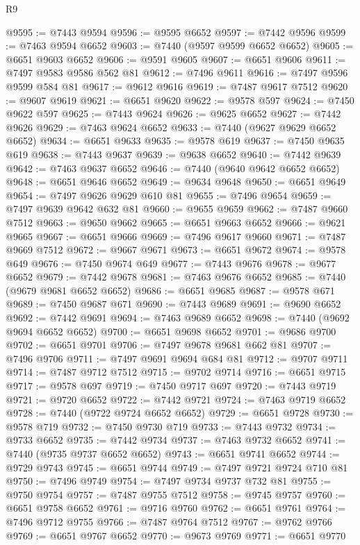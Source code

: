 \begin{lexlean}{R9}
\begin{coremodule}
{{{{{{{{{{{{{{{{{{{{{{{{{{{{{{{{{{{{{{{{{{{{{{{{{{{{{{{{{{{{{{{{{{{{{{{{{{{{{{{{{{{{@9595 := @7443 @9594
@9596 := @9595 @6652
@9597 := @7442 @9596
@9599 := @7463 @9594 @6652
@9603 := @7440 (@9597 @9599 @6652 @6652)
@9605 := @6651 @9603 @6652
@9606 := @9591 @9605
@9607 := @6651 @9606
@9611 := @7497 @9583 @9586 @562 @81
@9612 := @7496 @9611
@9616 := @7497 @9596 @9599 @584 @81
@9617 := @9612 @9616
@9619 := @7487 @9617 @7512
@9620 := @9607 @9619
@9621 := @6651 @9620
@9622 := @9578 @597
@9624 := @7450 @9622 @597
@9625 := @7443 @9624
@9626 := @9625 @6652
@9627 := @7442 @9626
@9629 := @7463 @9624 @6652
@9633 := @7440 (@9627 @9629 @6652 @6652)
@9634 := @6651 @9633
@9635 := @9578 @619
@9637 := @7450 @9635 @619
@9638 := @7443 @9637
@9639 := @9638 @6652
@9640 := @7442 @9639
@9642 := @7463 @9637 @6652
@9646 := @7440 (@9640 @9642 @6652 @6652)
@9648 := @6651 @9646 @6652
@9649 := @9634 @9648
@9650 := @6651 @9649
@9654 := @7497 @9626 @9629 @610 @81
@9655 := @7496 @9654
@9659 := @7497 @9639 @9642 @632 @81
@9660 := @9655 @9659
@9662 := @7487 @9660 @7512
@9663 := @9650 @9662
@9665 := @6651 @9663 @6652
@9666 := @9621 @9665
@9667 := @6651 @9666
@9669 := @7496 @9617 @9660
@9671 := @7487 @9669 @7512
@9672 := @9667 @9671
@9673 := @6651 @9672
@9674 := @9578 @649
@9676 := @7450 @9674 @649
@9677 := @7443 @9676
@9678 := @9677 @6652
@9679 := @7442 @9678
@9681 := @7463 @9676 @6652
@9685 := @7440 (@9679 @9681 @6652 @6652)
@9686 := @6651 @9685
@9687 := @9578 @671
@9689 := @7450 @9687 @671
@9690 := @7443 @9689
@9691 := @9690 @6652
@9692 := @7442 @9691
@9694 := @7463 @9689 @6652
@9698 := @7440 (@9692 @9694 @6652 @6652)
@9700 := @6651 @9698 @6652
@9701 := @9686 @9700
@9702 := @6651 @9701
@9706 := @7497 @9678 @9681 @662 @81
@9707 := @7496 @9706
@9711 := @7497 @9691 @9694 @684 @81
@9712 := @9707 @9711
@9714 := @7487 @9712 @7512
@9715 := @9702 @9714
@9716 := @6651 @9715
@9717 := @9578 @697
@9719 := @7450 @9717 @697
@9720 := @7443 @9719
@9721 := @9720 @6652
@9722 := @7442 @9721
@9724 := @7463 @9719 @6652
@9728 := @7440 (@9722 @9724 @6652 @6652)
@9729 := @6651 @9728
@9730 := @9578 @719
@9732 := @7450 @9730 @719
@9733 := @7443 @9732
@9734 := @9733 @6652
@9735 := @7442 @9734
@9737 := @7463 @9732 @6652
@9741 := @7440 (@9735 @9737 @6652 @6652)
@9743 := @6651 @9741 @6652
@9744 := @9729 @9743
@9745 := @6651 @9744
@9749 := @7497 @9721 @9724 @710 @81
@9750 := @7496 @9749
@9754 := @7497 @9734 @9737 @732 @81
@9755 := @9750 @9754
@9757 := @7487 @9755 @7512
@9758 := @9745 @9757
@9760 := @6651 @9758 @6652
@9761 := @9716 @9760
@9762 := @6651 @9761
@9764 := @7496 @9712 @9755
@9766 := @7487 @9764 @7512
@9767 := @9762 @9766
@9769 := @6651 @9767 @6652
@9770 := @9673 @9769
@9771 := @6651 @9770
}}}}}}}}}}}}}}}}}}}}}}}}}}}}}}}}}}}}}}}}}}}}}}}}}}}}}}}}}}}}}}}}}}}}}}}}}}}}}}}}}}}}
\end{coremodule}
\end{lexlean}
